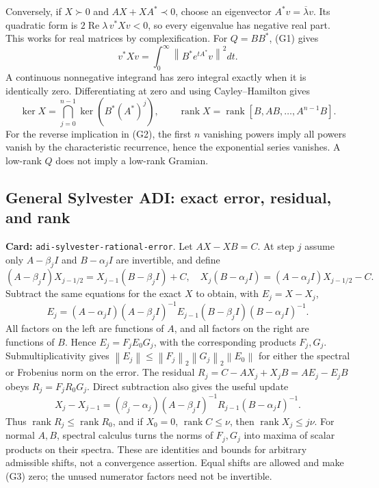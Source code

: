 \documentclass[11pt,a4paper]{article}
\newcommand{\norm}[1]{\left\lVert#1\right\rVert}
\DeclareMathOperator{\rank}{rank}
\DeclareRobustCommand{\code}[1]{{\footnotesize\urlstyle{tt}\nolinkurl{#1}}}
\begin{document}
Conversely, if $X\succ0$ and $AX+XA^*\prec0$, choose an eigenvector
$A^*v=\overline\lambda v$. Its quadratic form is
$2\operatorname{Re}\lambda\,v^*Xv<0$, so every eigenvalue has negative
real part. This works for real matrices by complexification.
For $Q=BB^*$, (G1) gives
\[
 v^*Xv=\int_0^\infty\norm{B^*e^{tA^*}v}^2dt.
\]
A continuous nonnegative integrand has zero integral exactly when it is
identically zero. Differentiating at zero and using Cayley--Hamilton gives
\[
 \ker X=\bigcap_{j=0}^{n-1}\ker(B^*(A^*)^j),\qquad
 \rank X=\rank[B,AB,\ldots,A^{n-1}B]. \tag{G2}
\]
For the reverse implication in (G2), the first $n$ vanishing powers imply
all powers vanish by the characteristic recurrence, hence the exponential
series vanishes. A low-rank $Q$ does not imply a low-rank Gramian.

\subsection{General Sylvester ADI: exact error, residual, and rank}
\label{route:adi-sylvester-rational-error}
\textbf{Card:} \code{adi-sylvester-rational-error}.
Let $AX-XB=C$. At step $j$ assume only $A-\beta_jI$ and $B-\alpha_jI$
are invertible, and define
\[
 (A-\beta_jI)X_{j-1/2}=X_{j-1}(B-\beta_jI)+C,
 \quad X_j(B-\alpha_jI)=(A-\alpha_jI)X_{j-1/2}-C.
\]
Subtract the same equations for the exact $X$ to obtain, with $E_j=X-X_j$,
\[
 E_j=(A-\alpha_jI)(A-\beta_jI)^{-1}E_{j-1}
                (B-\beta_jI)(B-\alpha_jI)^{-1}.
\]
All factors on the left are functions of $A$, and all factors on the right
are functions of $B$. Hence $E_j=F_jE_0G_j$, with the corresponding products
$F_j,G_j$. Submultiplicativity gives
$\norm{E_j}\le\norm{F_j}_2\norm{G_j}_2\norm{E_0}$ for either
the spectral or Frobenius norm on the error. The residual
$R_j=C-AX_j+X_jB=AE_j-E_jB$ obeys
$R_j=F_jR_0G_j$. Direct subtraction also gives the useful update
\[
 X_j-X_{j-1}=(\beta_j-\alpha_j)(A-\beta_jI)^{-1}R_{j-1}
                                         (B-\alpha_jI)^{-1}. \tag{G3}
\]
Thus $\rank R_j\le\rank R_0$, and if $X_0=0$, $\rank C\le\nu$, then
$\rank X_j\le j\nu$. For normal $A,B$, spectral calculus turns the
norms of $F_j,G_j$ into maxima of scalar products on their spectra.
These are identities and bounds for arbitrary admissible shifts, not a
convergence assertion. Equal shifts are allowed and make (G3) zero;
the unused numerator factors need not be invertible.
\end{document}
